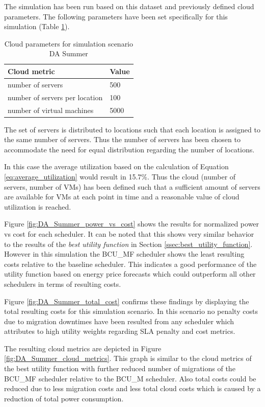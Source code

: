 The simulation has been run based on this dataset and previously defined cloud parameters. 
The following parameters have been set specifically for this simulation (Table \ref{tab:da_summer_cloud_parameters}). 


\begin{table}[htbp]
\centering
\begin{tabular}[\textwidth]{ll}
\toprule
	Cloud metric & Value  \\
\midrule
	number of servers & 500 \\
	number of servers per location & 100 \\
	number of virtual machines & 5000\\
\bottomrule
\end{tabular}
\caption{Cloud parameters for simulation scenario DA Summer}
\label{tab:da_summer_cloud_parameters}
\end{table}

The set of servers is distributed to locations such that each location is assigned to the same number of servers. Thus the number of servers has been chosen to accommodate the need for equal distribution regarding the number of locations. 


In this case the average utilization based on the calculation of Equation \ref{eq:average_utilization} would result in 15.7\%. 
Thus the cloud (number of servers, number of VMs) has been defined such that a sufficient amount of servers are available for VMs at each point in time and a reasonable value of cloud utilization is reached. 


Figure \ref{fig:DA_Summer_power_vs_cost} shows the results for normalized power vs cost for each scheduler. 
It can be noted that this shows very similar behavior to the results of the \textit{best utility function} in Section \ref{ssec:best_utility_function}. However in this simulation the BCU\_MF scheduler shows the least resulting costs relative to the baseline scheduler. This indicates a good performance of the utility function based on energy price forecasts which could outperform all other schedulers in terms of resulting costs. 

Figure \ref{fig:DA_Summer_total_cost} confirms these findings by displaying the total resulting costs for this simulation scenario. 
In this scenario no penalty costs due to migration downtimes have been resulted from any scheduler which attributes to high utility weights regarding SLA penalty and cost metrics. 

The resulting cloud metrics are depicted in Figure \ref{fig:DA_Summer_cloud_metrics}. This graph is similar to the cloud metrics of the best utility function with further reduced number of migrations of the BCU\_MF scheduler relative to the BCU\_M scheduler. Also total costs could be reduced due to less migration costs and less total cloud costs which is caused by a reduction of total power consumption. 


